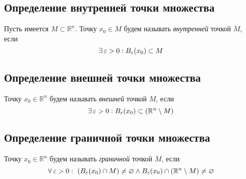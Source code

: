 \documentclass[a4paper]{article}
\begin{document}


\subsection{Определение внутренней точки множества}
 Пусть имеется $M\subset\mathbb{R}^n$. Точку $x_0\in M$ будем называть \textit{внутренней} точкой $M$, если $$\exists\operatorname{\varepsilon}>0:B_{\operatorname{\varepsilon}}(x_0)\subset M$$

\subsection{Определение внешней точки множества}
 Точку $x_0\in \mathbb{R}^n$ будем называть \textit{внешней} точкой $M$, если $$\exists\operatorname{\varepsilon}>0:B_{\operatorname{\varepsilon}}(x_0)\subset (\mathbb{R}^n\setminus M)$$

\subsection{Определение граничной точки множества}
 Точку $x_0\in\mathbb{R}^n$ будем называть \textit{граничной} точкой $M$, если $$\forall \ve>0:\ \left(B_{\ve}(x_0)\cap M\right)\ne\varnothing\wedge B_{\ve}(x_0)\cap(\mathbb{R}^n\setminus M)\ne\varnothing$$ 
\end{document}
